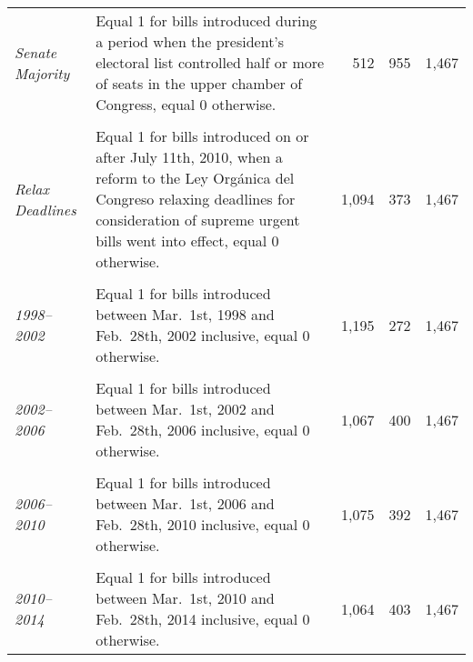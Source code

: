 \documentclass[letter,12pt]{article}
\begin{document}
\begin{footnotesize}
\begin{tabularx}{\textwidth}{lXrrr}
\\ [-1ex]
\emph{Senate Majority}               & Equal 1 for bills introduced during a period when the president's electoral list controlled half or more of seats in the upper chamber of Congress, equal 0 otherwise. &    512 &   955 & 1,467 \\ [.5ex] %
\\ [-1ex]
\emph{Relax Deadlines}               & Equal 1 for bills introduced on or after July 11th, 2010, when a reform to the Ley Orgánica del Congreso relaxing deadlines for consideration of supreme urgent bills went into effect, equal 0 otherwise. &  1,094 &   373 & 1,467 \\ [.5ex] %
\\ [-1ex]
\emph{1998--2002}                    & Equal 1 for bills introduced between Mar.\ 1st, 1998 and Feb.\ 28th, 2002 inclusive, equal 0 otherwise. &  1,195 &   272 & 1,467 \\ [.5ex] %
\\ [-1ex]
\emph{2002--2006}                    & Equal 1 for bills introduced between Mar.\ 1st, 2002 and Feb.\ 28th, 2006 inclusive, equal 0 otherwise.       &  1,067 &   400 & 1,467 \\ [.5ex] %
\\ [-1ex]
\emph{2006--2010}                    & Equal 1 for bills introduced between Mar.\ 1st, 2006 and Feb.\ 28th, 2010 inclusive, equal 0 otherwise.       &  1,075 &   392 & 1,467 \\ [.5ex] %
\\ [-1ex]
\emph{2010--2014}                    & Equal 1 for bills introduced between Mar.\ 1st, 2010 and Feb.\ 28th, 2014 inclusive, equal 0 otherwise.       &  1,064 &   403 & 1,467 \\ [.5ex] %
\hline
\end{tabularx}
\doublespacing
\end{footnotesize}
  
\end{document}
